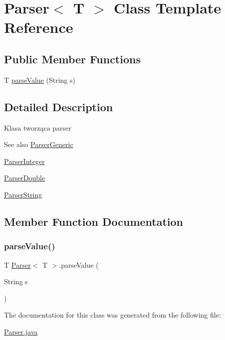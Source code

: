 \hypertarget{classParser}{}\section{Parser$<$ T $>$ Class Template Reference}
\label{classParser}
\subsection*{Public Member Functions}
\begin{DoxyCompactItemize}
\item 
T \hyperlink{classParser_afe323123f280bae8fd74257f7f931609}{parse\+Value} (String s)
\end{DoxyCompactItemize}


\subsection{Detailed Description}
Klasa tworząca parser \begin{DoxySeeAlso}{See also}
\hyperlink{interfaceParserGeneric}{Parser\+Generic} 

\hyperlink{classParserInteger}{Parser\+Integer} 

\hyperlink{classParserDouble}{Parser\+Double} 

\hyperlink{classParserString}{Parser\+String} 
\end{DoxySeeAlso}


\subsection{Member Function Documentation}
\mbox{\label{classParser_afe323123f280bae8fd74257f7f931609}} 
\subsubsection{\texorpdfstring{parse\+Value()}{parseValue()}}
{\footnotesize\ttfamily T \hyperlink{classParser}{Parser}$<$ T $>$.parse\+Value (\begin{DoxyParamCaption}\item[{String}]{s }\end{DoxyParamCaption})\hspace{0.3cm}{\ttfamily [inline]}}



The documentation for this class was generated from the following file\+:\begin{DoxyCompactItemize}
\item 
\hyperlink{Parser_8java}{Parser.\+java}\end{DoxyCompactItemize}
